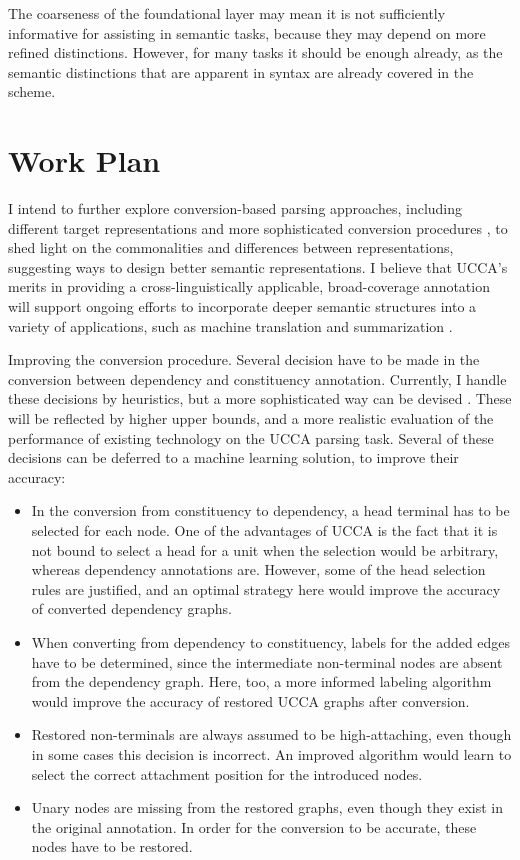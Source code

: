 \documentclass[11pt]{article}
\makeatletter
\renewcommand{\paragraph}{
  \@startsection{paragraph}{4}
  {\z@}{.3ex \@plus .3ex \@minus .2ex}{-1em}
  {\normalfont\normalsize\bfseries}
}
\makeatother
\begin{document}
The coarseness of the foundational layer may mean it is not
sufficiently informative for assisting in semantic tasks, because they may
depend on more refined distinctions. However, for many tasks it should be
enough already, as the semantic distinctions that are apparent in syntax are
already covered in the scheme.


\section{Work Plan}\label{sec:plan}

I intend to further explore conversion-based parsing approaches,
including different target representations and more sophisticated conversion
procedures \cite{kong-15},
to shed light on the commonalities and differences between representations,
suggesting ways to design better semantic representations.
I believe that UCCA's merits in providing a cross-linguistically applicable,
broad-coverage annotation will support ongoing efforts to incorporate deeper
semantic structures into a variety of applications, such as machine translation
\cite{jones2012semantics} and summarization \cite{liu2015toward}.

\paragraph{Improving the conversion procedure.}
Several decision have to be made in the conversion between dependency and
constituency annotation.
Currently, I handle these decisions by heuristics, but a more
sophisticated way can be devised \cite{fernandez2015parsing}.
These will be reflected by higher upper bounds, and a more realistic evaluation
of the performance of existing technology on the UCCA parsing task.
Several of these decisions can be deferred to a machine learning solution,
to improve their accuracy:
\begin{itemize}
\item In the conversion from constituency to dependency, a head terminal has to be
selected for each node. One of the advantages of UCCA is the fact that it is not bound
to select a head for a unit when the selection would be arbitrary, whereas dependency
annotations are. However, some of the head selection rules are justified, and an
optimal strategy here would improve the accuracy of converted dependency graphs.
\item When converting from dependency to constituency, labels for the
added edges have to be determined, since the intermediate non-terminal nodes are absent
from the dependency graph. Here, too, a more informed labeling algorithm would
improve the accuracy of restored UCCA graphs after conversion.
\item Restored non-terminals are always assumed to be high-attaching, even though
in some cases this decision is incorrect. An improved algorithm would learn to select
the correct attachment position for the introduced nodes.
\item Unary nodes are missing from the restored graphs, even though they exist in the
original annotation. In order for the conversion to be accurate, these nodes have to
be restored.
\end{itemize}
\end{document}
